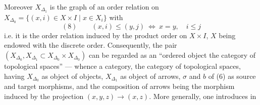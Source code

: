 Moreover $X_{\Delta_1}$ is the graph of an order
relation on $X_{\Delta_0}=\{(x,i)\in X\times I\mid x\in X_i\}$
with
\[
(8)\qquad (x,i)\leq(y,j)\ \Longleftrightarrow\ x=y,\quad i\leq j
\]
i.e. it is the order relation induced by
the product order on $X\times I$, $X$ being endowed
with the discrete order. Consequently, the
pair $(X_{\Delta_0},X_{\Delta_1}\subset X_{\Delta_0}\times X_{\Delta_0})$ can
be regarded as an ``ordered object 
the category of topological spaces'' ---
whence a category,  the category
of topological spaces, having $X_{\Delta_0}$ as
object of objects, $X_{\Delta_1}$ as object
of arrows, $\sigma$ and $b$ of (6) as
source and target morphisms, and the
composition of arrows being the
morphism
induced by the projection $(x,y,z)\longrightarrow(x,z)$.
More generally, one introduces in
